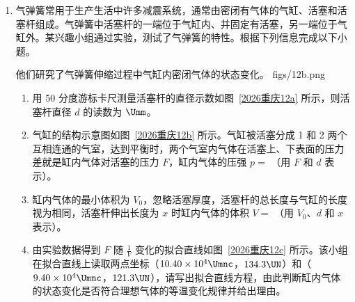 \documentclass[\gkver]{gaokaozhenti}
\begin{document}
\begin{enumerate}
{\begin{enumerate}
	\item
	$3.86 \UJ$
\end{enumerate}
}
\item
气弹簧常用于生产生活中许多减震系统，通常由密闭有气体的气缸、活塞和活塞杆组成。气弹簧中活塞杆的一端位于气缸内、并固定有活塞，另一端位于气缸外。某兴趣小组通过实验，测试了气弹簧的特性。根据下列信息完成以下小题。

他们研究了气弹簧伸缩过程中气缸内密闭气体的状态变化。
{figs/12b.png}
\begin{enumerate}
	\item
	用 50 分度游标卡尺测量活塞杆的直径示数如图~\ref{2026重庆12a} 所示，则活塞杆直径 $d$ 的读数为  $\Umm$。
	\item
	气缸的结构示意图如图~\ref{2026重庆12b} 所示。气缸被活塞分成 1 和 2 两个互相连通的气室，达到平衡时，两个气室内气体在活塞上、下表面的压力差就是缸内气体对活塞的压力 $F$，缸内气体的压强 $p=$ （用 $F$ 和 $d$ 表示）。
	\item
	缸内气体的最小体积为 $V_{0}$，忽略活塞厚度，活塞杆的总长度与气缸的长度视为相同，活塞杆伸出长度为 $x$ 时缸内气体的体积 $V=$ （用 $V_{0}$、$d$ 和 $x$ 表示）。
	\item
	由实验数据得到 $F$ 随 $\frac{1}{V}$ 变化的拟合直线如图~\ref{2026重庆12c} 所示。该小组在拟合直线上读取两点坐标（$10.40\times10^{4} \Umnc$，$134.3 \UN$）和（$9.40\times10^{4} \Umnc$，$121.3 \UN$），请写出拟合直线方程，由此判断缸内气体的状态变化是否符合理想气体的等温变化规律并给出理由。
\end{enumerate}
\onepicture[num=3, label=2026重庆12c, w=9.5cm]{}


\end{enumerate}
\end{document}
